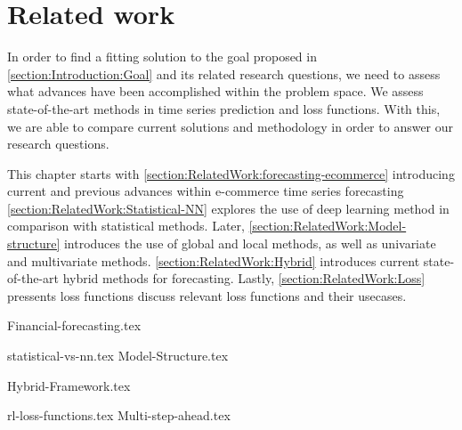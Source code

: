 \chapter{Related work}
\label{section:RelatedWork}

\iffalse
Our problem can be composed into two main categories.
time series forecasting, and e-commerce trend forecasting.
What is the characteristics of e-commerce trend forecasting?
The domain consists of multiple time series, some which correlate.
The time series contains multiple periods, for example users shop
online ofter on sundays than on mondays. 
Some categories are popular in the spring, others in the fall.
Mabye online shopping spikes around common paydays?
\fi


In order to find a fitting solution to the goal proposed in \ref{section:Introduction:Goal} and its related research questions,
we need to assess what advances have been accomplished within the problem space.
We assess state-of-the-art methods in time series prediction and loss functions.
With this, we are able to compare current solutions and methodology in order to answer our research questions.

This chapter starts with \autoref{section:RelatedWork:forecasting-ecommerce} introducing current and previous advances within e-commerce time series forecasting
\autoref{section:RelatedWork:Statistical-NN} explores the use of deep learning method in comparison with statistical methods.
Later, \autoref{section:RelatedWork:Model-structure} introduces the use of global and local methods, as well as univariate and multivariate methods.
\autoref{section:RelatedWork:Hybrid} introduces current state-of-the-art hybrid methods for forecasting.
Lastly, \autoref{section:RelatedWork:Loss} pressents loss functions discuss relevant loss functions and their usecases.



{Financial-forecasting.tex}

{statistical-vs-nn.tex}
{Model-Structure.tex}

{Hybrid-Framework.tex}

{rl-loss-functions.tex}
{Multi-step-ahead.tex}
